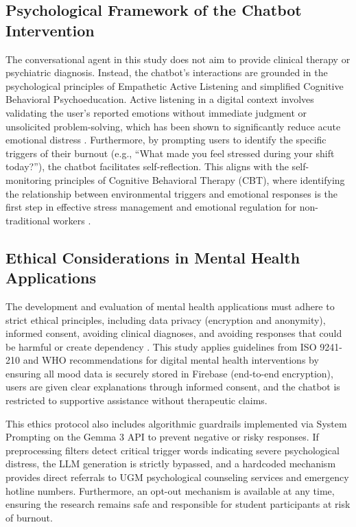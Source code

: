 \subsection{Psychological Framework of the Chatbot Intervention}

The conversational agent in this study does not aim to provide clinical therapy or psychiatric diagnosis. Instead, the chatbot's interactions are grounded in the psychological principles of Empathetic Active Listening and simplified Cognitive Behavioral Psychoeducation. Active listening in a digital context involves validating the user's reported emotions without immediate judgment or unsolicited problem-solving, which has been shown to significantly reduce acute emotional distress \cite{miner2016chatbot}. Furthermore, by prompting users to identify the specific triggers of their burnout (e.g., ``What made you feel stressed during your shift today?''), the chatbot facilitates self-reflection. This aligns with the self-monitoring principles of Cognitive Behavioral Therapy (CBT), where identifying the relationship between environmental triggers and emotional responses is the first step in effective stress management and emotional regulation for non-traditional workers \cite{beck2020cbt}.

\subsection{Ethical Considerations in Mental Health Applications}

The development and evaluation of mental health applications must adhere to strict ethical principles, including data privacy (encryption and anonymity), informed consent, avoiding clinical diagnoses, and avoiding responses that could be harmful or create dependency \cite{who2023ethics, torous2021standards}. This study applies guidelines from ISO 9241-210 and WHO recommendations for digital mental health interventions by ensuring all mood data is securely stored in Firebase (end-to-end encryption), users are given clear explanations through informed consent, and the chatbot is restricted to supportive assistance without therapeutic claims.

This ethics protocol also includes algorithmic guardrails implemented via System Prompting on the Gemma 3 API to prevent negative or risky responses. If preprocessing filters detect critical trigger words indicating severe psychological distress, the LLM generation is strictly bypassed, and a hardcoded mechanism provides direct referrals to UGM psychological counseling services and emergency hotline numbers. Furthermore, an opt-out mechanism is available at any time, ensuring the research remains safe and responsible for student participants at risk of burnout.

